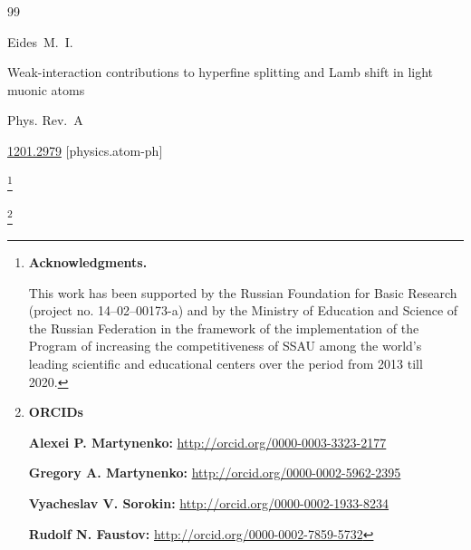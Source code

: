 \begin{thebibliography}{99}








\by Eides~M.~I.

\paper Weak-interaction contributions to hyperfine splitting and Lamb shift in light muonic atoms

\jour Phys. Rev.~A






\arxiv \href{http://arxiv.org/abs/1201.2979}{1201.2979} [physics.atom-ph]



\end{thebibliography}





\RuDate



\newpage



\makeentitle



\newpage



\thanks{\textbf{Acknowledgments.} 

This work has been supported by the Russian Foundation for Basic Research (project no. 14–02–00173-a) and by the Ministry of Education and Science of the Russian Federation in the framework of the implementation of the Program of increasing the competitiveness of SSAU among the world's leading scientific and educational centers over the period from 2013 till 2020.

}



\thanks{{\bf ORCIDs}



{\bf Alexei P. Martynenko:} \url{http://orcid.org/0000-0003-3323-2177}



{\bf Gregory A. Martynenko:} \url{http://orcid.org/0000-0002-5962-2395}



{\bf Vyacheslav V. Sorokin:} \url{http://orcid.org/0000-0002-1933-8234}



{\bf Rudolf N. Faustov:} \url{http://orcid.org/0000-0002-7859-5732}





}







